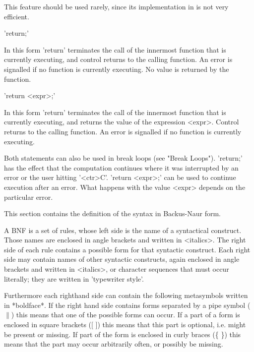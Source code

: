 This feature should be used rarely, since its implementation in {\GAP} is
not very efficient.

%

'return;'

In this form 'return' terminates the call of  the innermost function that
is currently executing, and control returns to  the calling function.  An
error  is signalled if no  function is currently  executing.  No value is
returned by the function.

'return <expr>;'

In this form 'return' terminates the call of the innermost  function that
is currently executing, and returns  the value  of the expression <expr>.
Control returns  to the calling  function.  An error is  signalled if  no
function is currently executing.

Both statements  can also be used in  break loops  (see  "Break  Loops").
'return;'  has the effect  that the  computation  continues  where it was
interrupted by an error or the user hitting  '<ctr>C'.   'return <expr>;'
can be used to continue execution after an error.  What  happens with the
value <expr> depends on the particular error.

%

This section contains the definition  of the {\GAP} syntax in Backus-Naur
form.

A  BNF is a set of rules, whose left side  is the name of  a  syntactical
construct.  Those  names  are enclosed in angle  brackets and  written in
<italics>.  The right side of each rule contains a possible form for that
syntactic  construct.   Each  right  side  may  contain  names  of  other
syntactic  constructs,  again  enclosed in angle brackets and written  in
<italics>,  or character  sequences that  must  occur literally; they are
written in 'typewriter style'.

Furthermore  each righthand side  can contain  the  following metasymbols
written in *boldface*.  If the right  hand  side contains forms separated
by a pipe symbol  ($\|$)  this means  that one  of the possible forms can
occur.  If a part of a form  is enclosed  in square brackets  ([ ])  this
means that this part is optional, i.e.  might be present or  missing.  If
part  of the form is enclosed  in curly braces  (\{  \})  this means that
the part may occur arbitrarily often, or possibly be missing.

